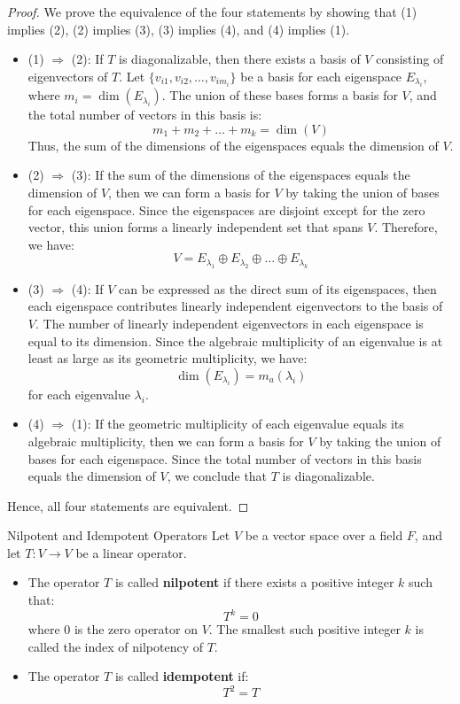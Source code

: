 \documentclass[openany]{book}
\begin{document}
\begin{proof}
    We prove the equivalence of the four statements by showing that (1) implies (2), (2) implies (3), (3) implies (4), and (4) implies (1).
    \begin{itemize}
        \item (1) $\Rightarrow$ (2): If $T$ is diagonalizable, then there exists a basis of $V$ consisting of eigenvectors of $T$. Let $\{v_{i1}, v_{i2}, \ldots, v_{im_i}\}$ be a basis for each eigenspace $E_{\lambda_i}$, where $m_i = \dim(E_{\lambda_i})$. The union of these bases forms a basis for $V$, and the total number of vectors in this basis is:
        $$m_1 + m_2 + \ldots + m_k = \dim(V)$$
        Thus, the sum of the dimensions of the eigenspaces equals the dimension of $V$.
        \item (2) $\Rightarrow$ (3): If the sum of the dimensions of the eigenspaces equals the dimension of $V$, then we can form a basis for $V$ by taking the union of bases for each eigenspace. Since the eigenspaces are disjoint except for the zero vector, this union forms a linearly independent set that spans $V$. Therefore, we have:
        $$V = E_{\lambda_1} \oplus E_{\lambda_2} \oplus \ldots \oplus E_{\lambda_k}$$
        \item (3) $\Rightarrow$ (4): If $V$ can be expressed as the direct sum of its eigenspaces, then each eigenspace contributes linearly independent eigenvectors to the basis of $V$. The number of linearly independent eigenvectors in each eigenspace is equal to its dimension. Since the algebraic multiplicity of an eigenvalue is at least as large as its geometric multiplicity, we have:
        $$\dim(E_{\lambda_i}) = m_a(\lambda_i)$$
        for each eigenvalue $\lambda_i$.
        \item (4) $\Rightarrow$ (1): If the geometric multiplicity of each eigenvalue equals its algebraic multiplicity, then we can form a basis for $V$ by taking the union of bases for each eigenspace. Since the total number of vectors in this basis equals the dimension of $V$, we conclude that $T$ is diagonalizable.
    \end{itemize}
    Hence, all four statements are equivalent.
\end{proof}
\begin{mydefinition}{Nilpotent and Idempotent Operators}
    Let $V$ be a vector space over a field $F$, and let $T: V \to V$ be a linear operator. 
    \begin{itemize}
        \item The operator $T$ is called \textbf{nilpotent} if there exists a positive integer $k$ such that:
        $$T^k = 0$$
        where $0$ is the zero operator on $V$. The smallest such positive integer $k$ is called the index of nilpotency of $T$.
        \item The operator $T$ is called \textbf{idempotent} if:
        $$T^2 = T$$
    \end{itemize}
\end{mydefinition}
\end{document}
